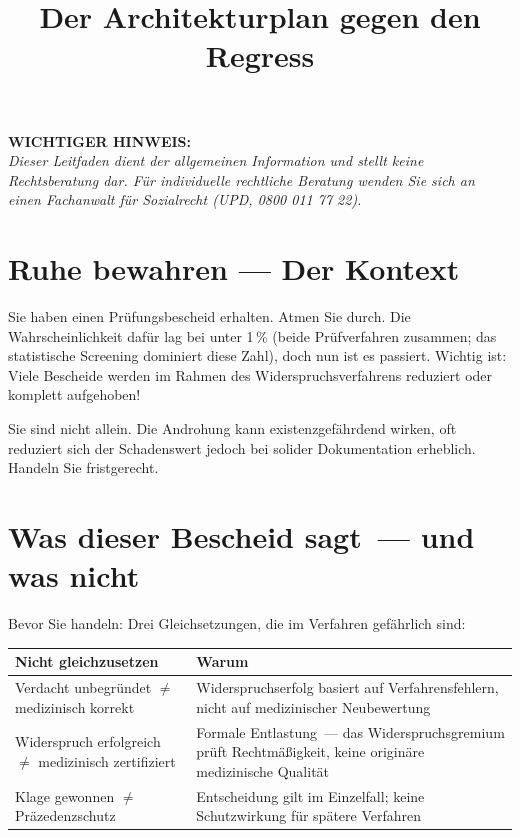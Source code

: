 \documentclass[a4paper]{umbruch-position}
\title{Der Architekturplan gegen den Regress}
\begin{document}
\maketitle

\begin{infobox}
\textbf{WICHTIGER HINWEIS:}\\
\textit{Dieser Leitfaden dient der allgemeinen Information und stellt keine Rechtsberatung dar. F\"ur individuelle rechtliche Beratung wenden Sie sich an einen Fachanwalt f\"ur Sozialrecht (UPD, 0800 011 77 22).}
\end{infobox}

\section{Ruhe bewahren --- Der Kontext}

Sie haben einen Pr\"ufungsbescheid erhalten. Atmen Sie durch.
Die Wahrscheinlichkeit daf\"ur lag bei unter 1\,\% (beide Pr\"ufverfahren zusammen; das statistische Screening dominiert diese Zahl), doch nun ist es passiert. Wichtig ist: Viele Bescheide werden im Rahmen des Widerspruchsverfahrens reduziert oder komplett aufgehoben!

Sie sind nicht allein. Die Androhung kann existenzgef\"ahrdend wirken, oft reduziert sich der Schadenswert jedoch bei solider Dokumentation erheblich. Handeln Sie fristgerecht.

\section{Was dieser Bescheid sagt~--- und was nicht}

Bevor Sie handeln: Drei Gleichsetzungen, die im Verfahren gef\"ahrlich sind:

\begin{center}
{\small
\begin{tabular}{p{5cm} p{7cm}}
\toprule
\textbf{Nicht gleichzusetzen} & \textbf{Warum} \\
\midrule
Verdacht unbegr\"undet $\neq$ medizinisch korrekt & Widerspruchserfolg basiert auf Verfahrensfehlern, nicht auf medizinischer Neubewertung \\[4pt]
Widerspruch erfolgreich $\neq$ medizinisch zertifiziert & Formale Entlastung~--- das Widerspruchsgremium pr\"uft Rechtm\"a\ss{}igkeit, keine originäre medizinische Qualit\"at \\[4pt]
Klage gewonnen $\neq$ Pr\"azedenzschutz & Entscheidung gilt im Einzelfall; keine Schutzwirkung f\"ur sp\"atere Verfahren \\
\bottomrule
\end{tabular}
}
\end{center}
\end{document}
